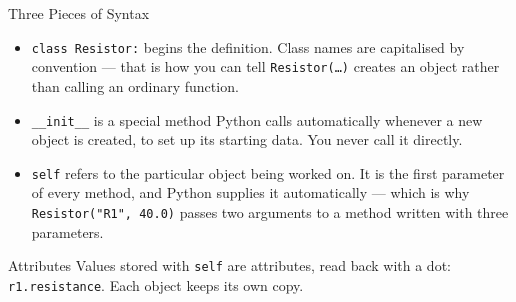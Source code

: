 \documentclass[9pt,aspectratio=169,xcolor=table]{beamer}
\begin{document}
\begin{frame}{Three Pieces of Syntax}
    \leavevmode
    \small
    \begin{itemize}\itemsep3pt
        \item \texttt{class Resistor:} begins the definition. Class names
              are capitalised by convention --- that is how you can tell
              \texttt{Resistor(\ldots)} creates an object rather than
              calling an ordinary function.
        \item \texttt{\_\_init\_\_} is a special method Python calls
              \alert{automatically} whenever a new object is created, to
              set up its starting data. You never call it directly.
        \item \texttt{self} refers to \alert{the particular object being
              worked on}. It is the first parameter of every method, and
              Python supplies it automatically --- which is why
              \texttt{Resistor("R1", 40.0)} passes two arguments to a
              method written with three parameters.
    \end{itemize}

    \vspace{2mm}
    \begin{block}{Attributes}
        Values stored with \texttt{self} are \alert{attributes}, read
        back with a dot: \texttt{r1.resistance}. Each object keeps its
        own copy.
    \end{block}
\end{frame}
\end{document}
